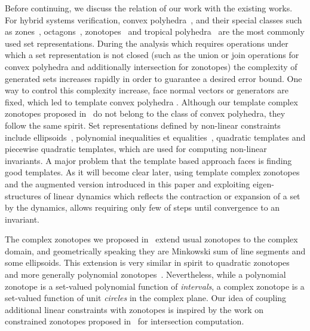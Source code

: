 

Before continuing, we discuss the relation of our work with the existing works. For hybrid systems verification, convex polyhedra~\cite{DBLP:conf/popl/CousotH78}, and their special classes such as
zones~\cite{DBLP:conf/pado/Mine01},
octagons~\cite{DBLP:journals/lisp/Mine06}, zonotopes~\cite{HSCC05} and tropical
polyhedra~\cite{DBLP:conf/sas/AllamigeonGG08} are the most commonly used set representations. During the analysis which requires operations under which a set representation is not closed (such as the union or join operations for convex polyhedra and additionally intersection for zonotopes) the complexity of generated sets increases rapidly in order to guarantee a desired error bound. One way to control this complexity increase, face normal vectors or generators are fixed, which led to template convex polyhedra \cite{Sankaranarayanan+Dang+Ivancic-08-Symbolic,Gawlitza}. Although our template complex zonotopes proposed in~\cite{arvind2016lis} do not belong to the class of convex polyhedra, they follow the same spirit. Set representations defined by non-linear constraints include ellipsoids~\cite{KurzhanskiVaraiya00}, polynomial inequalities\cite{bagrodzafSAS05} et equalities~\cite{Rodriguez-Carbonell:2007}, quadratic templates and piecewise quadratic templates\cite{Feron2010,AdjeGaubertGoubaultESOP2010,AdjeHSCC2017}, which are used for computing non-linear invariants. A major problem that the template based approach faces is finding good templates. As it will become clear later, using template complex zonotopes and the augmented version introduced in this paper and exploiting eigen-structures of linear dynamics which reflects the contraction or expansion of a set by the dynamics, allows requiring only few of steps until convergence to an invariant. 

The complex zonotopes we proposed in~\cite{arvind2016lis} extend usual zonotopes to the complex domain, and geometrically speaking they are Minkowski sum of line segments and some ellipsoids.
This extension is very similar in spirit to quadratic zonotopes~\cite{DBLP:conf/aplas/AdjeGW15} and more generally polynomial zonotopes~\cite{althoff2013}. Nevertheless, while a polynomial zonotope is a set-valued polynomial function of \emph{intervals}, a complex zonotope is a set-valued function of unit \emph{circles} in the complex plane. Our idea of coupling additional linear constraints with zonotopes is inspired by the work on constrained zonotopes proposed in~\cite{Ghorbal2010,DBLP:conf/cav/GhorbalGP09} for intersection computation.
